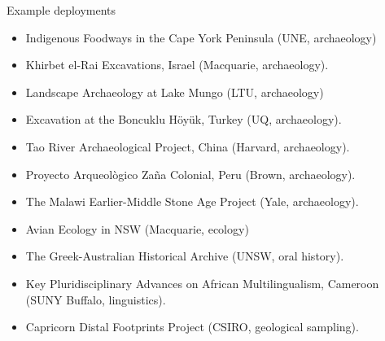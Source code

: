 \begin{frame}{Example deployments}
 \begin{itemize}
        \item Indigenous Foodways in the Cape York Peninsula (UNE, archaeology)
        \item Khirbet el-Rai Excavations, Israel (Macquarie, archaeology).
        \item Landscape Archaeology at Lake Mungo (LTU, archaeology)
        \item Excavation at the Boncuklu Höyük, Turkey (UQ, archaeology).
        \item Tao River Archaeological Project, China (Harvard, archaeology).
        \item Proyecto Arqueològico Zaña Colonial, Peru (Brown, archaeology).
        \item The Malawi Earlier-Middle Stone Age Project (Yale, archaeology).
        \item Avian Ecology in NSW (Macquarie, ecology)
        \item The Greek-Australian Historical Archive (UNSW, oral history).
        \item Key Pluridisciplinary Advances on African Multilingualism, Cameroon (SUNY Buffalo, linguistics).
        \item Capricorn Distal Footprints Project (CSIRO, geological sampling).

    \end{itemize}
\end{frame}